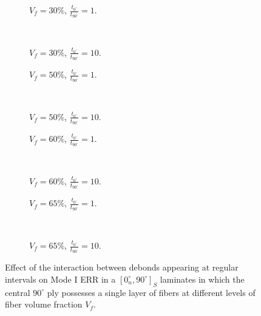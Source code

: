 \documentclass[review]{elsarticle}
\begin{document}
\begin{figure}[!h]
\centering
    \begin{subfigure}[b]{0.45\textwidth}
        \caption{$V_{f}=30\%$, $\frac{t_{0^{\circ}}}{t_{90^{\circ}}}=1$.}\label{subfig:sidefiber30MIthick1}
    \end{subfigure} ~
    \begin{subfigure}[b]{0.45\textwidth}
         \caption{$V_{f}=30\%$, $\frac{t_{0^{\circ}}}{t_{90^{\circ}}}=10$.}\label{subfig:sidefiber30MIthick10}
    \end{subfigure}

   \begin{subfigure}[b]{0.45\textwidth}
        \caption{$V_{f}=50\%$, $\frac{t_{0^{\circ}}}{t_{90^{\circ}}}=1$.}\label{subfig:sidefiber50MIthick1}
    \end{subfigure} ~
    \begin{subfigure}[b]{0.45\textwidth}
         \caption{$V_{f}=50\%$, $\frac{t_{0^{\circ}}}{t_{90^{\circ}}}=10$.}\label{subfig:sidefiber50MIthick10}
    \end{subfigure}

    \begin{subfigure}[b]{0.45\textwidth}
        \caption{$V_{f}=60\%$, $\frac{t_{0^{\circ}}}{t_{90^{\circ}}}=1$.}\label{subfig:sidefiber60MIthick1}
    \end{subfigure} ~
    \begin{subfigure}[b]{0.45\textwidth}
        \caption{$V_{f}=60\%$, $\frac{t_{0^{\circ}}}{t_{90^{\circ}}}=10$.}\label{subfig:sidefiber60MIthick10}
    \end{subfigure}

    \begin{subfigure}[b]{0.45\textwidth}
        \caption{$V_{f}=65\%$, $\frac{t_{0^{\circ}}}{t_{90^{\circ}}}=1$.}\label{subfig:sidefiber65MIthick1}
    \end{subfigure} ~
    \begin{subfigure}[b]{0.45\textwidth}
        \caption{$V_{f}=65\%$, $\frac{t_{0^{\circ}}}{t_{90^{\circ}}}=10$.}\label{subfig:sidefiber65MIthick10}
    \end{subfigure}

\caption{Effect of the interaction between debonds appearing at regular intervals on Mode I ERR in a $\left[0^{\circ}_{n}, 90^{\circ}\right]_{S}$ laminates in which the central $90^{\circ}$ ply possesses a single layer of fibers at different levels of fiber volume fraction $V_{f}$.}\label{fig:sidefibersMI}
\end{figure}
\end{document}
